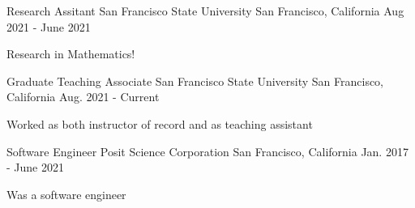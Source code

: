 \documentclass[../omelveny-cv]{subfiles}
\begin{document}


\begin{cventries}

    \cventry
    {Research Assitant}
    {San Francisco State University}
    {San Francisco, California}
    {Aug 2021 - June 2021}
    {
        \begin{cvitems}
            \item {Research in Mathematics!}
        \end{cvitems}
    }

    \cventry
    {Graduate Teaching Associate}
    {San Francisco State University}
    {San Francisco, California}
    {Aug. 2021 - Current}
    {
        \begin{cvitems}
            \item {Worked as both instructor of record and as teaching assistant}
        \end{cvitems}
    }

    \cventry
    {Software Engineer}
    {Posit Science Corporation}
    {San Francisco, California}
    {Jan. 2017 - June 2021}
    {
        \begin{cvitems}
            \item {Was a software engineer}
        \end{cvitems}
    }


\end{cventries}
\end{document}
